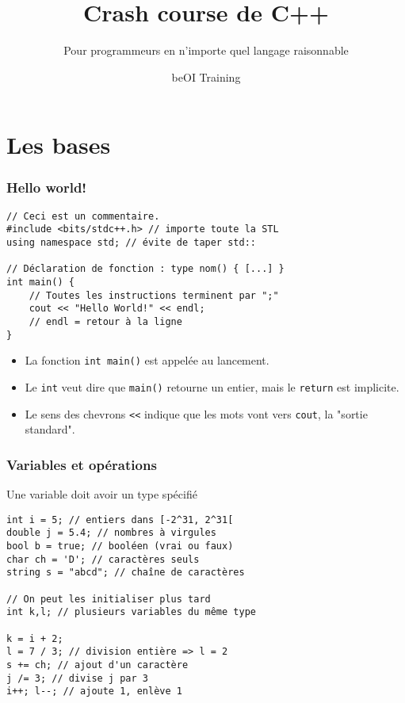 \documentclass[12pt]{beamer}
\title{Crash course de C++}
\subtitle{Pour programmeurs en n'importe quel langage raisonnable}
\author{beOI Training}
\institute{\texttt{[image: ../share/beoi-logo]}}
\begin{document}
\maketitle


\section{Les bases}
\begin{frame}[fragile]
\frametitle{Hello world!}
\begin{lstlisting}
// Ceci est un commentaire.
#include <bits/stdc++.h> // importe toute la STL
using namespace std; // évite de taper std::

// Déclaration de fonction : type nom() { [...] }
int main() {
    // Toutes les instructions terminent par ";"
    cout << "Hello World!" << endl;
    // endl = retour à la ligne
}
\end{lstlisting}
\begin{itemize}
\item La fonction \lstinline|int main()| est appelée au lancement.
\item Le \lstinline|int| veut dire que \lstinline|main()| retourne un entier, mais le \lstinline|return| est implicite.
\item Le sens des chevrons \lstinline|<<| indique que les mots vont vers \lstinline|cout|, la "sortie standard".
\end{itemize}
\end{frame}

\begin{frame}[fragile]
\frametitle{Variables et opérations}
Une variable doit avoir un type spécifié
\begin{lstlisting}
int i = 5; // entiers dans [-2^31, 2^31[
double j = 5.4; // nombres à virgules
bool b = true; // booléen (vrai ou faux)
char ch = 'D'; // caractères seuls
string s = "abcd"; // chaîne de caractères

// On peut les initialiser plus tard
int k,l; // plusieurs variables du même type

k = i + 2;
l = 7 / 3; // division entière => l = 2
s += ch; // ajout d'un caractère
j /= 3; // divise j par 3
i++; l--; // ajoute 1, enlève 1
\end{lstlisting}
\end{frame}
\end{document}
